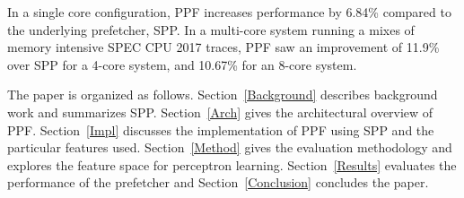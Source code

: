 In a single core configuration, PPF increases performance by 6.84\%
compared to the underlying prefetcher, SPP.  In a multi-core system running a
mixes of memory intensive SPEC CPU 2017 traces, PPF saw an improvement
of 11.9\% over SPP for a 4-core system, and 10.67\% for an 8-core system.

The paper is organized as follows. Section~\ref{Background} describes
background work and summarizes SPP.  Section~\ref{Arch} gives the 
architectural overview of PPF. Section~\ref{Impl} discusses the
implementation of PPF using SPP and the particular features used.
Section~\ref{Method} gives the evaluation methodology and explores the feature
space for perceptron learning.  Section~\ref{Results} evaluates the
performance of the prefetcher and Section~\ref{Conclusion} concludes the
paper.
